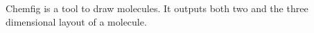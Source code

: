 Chemfig is a tool to draw molecules. It outputs both two and the three dimensional layout of a molecule.